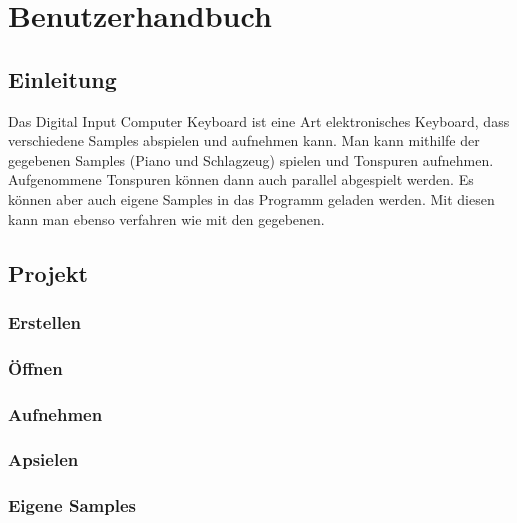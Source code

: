 \section{Benutzerhandbuch}
\subsection{Einleitung}
Das Digital Input Computer Keyboard ist eine Art elektronisches Keyboard, dass verschiedene Samples abspielen und aufnehmen kann. Man kann mithilfe der gegebenen Samples (Piano und Schlagzeug) spielen und Tonspuren aufnehmen. Aufgenommene Tonspuren können dann auch parallel abgespielt werden. Es können aber auch eigene Samples in das Programm geladen werden. Mit diesen kann man ebenso verfahren wie mit den gegebenen.
\subsection{Projekt}
\subsubsection{Erstellen}
\subsubsection{Öffnen}
\subsubsection{Aufnehmen}
\subsubsection{Apsielen}
\subsubsection{Eigene Samples}